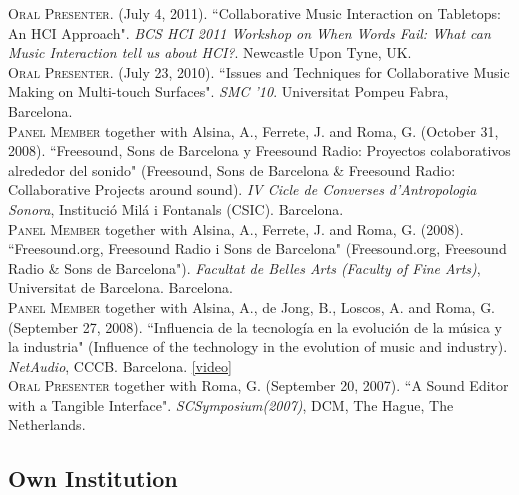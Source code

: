 \documentclass[10pt, a4paper]{article}
\newcommand{\years}[1]{\marginnote{\scriptsize #1}}
\begin{document}
{\years{2011a} \textsc{Oral Presenter}. (July 4, 2011). “Collaborative Music Interaction on Tabletops: An HCI Approach". \emph{BCS HCI 2011 Workshop on When Words Fail: What can Music Interaction tell us about HCI?}. Newcastle Upon Tyne, UK.\\
\years{2010} \textsc{Oral Presenter}. (July 23, 2010). “Issues and Techniques for Collaborative Music Making on Multi-touch Surfaces". \emph{SMC '10}. Universitat Pompeu Fabra, Barcelona.\\
\years{2008c} \textsc{Panel Member} together with Alsina, A., Ferrete, J. and Roma, G. (October 31, 2008). “Freesound, Sons de Barcelona y Freesound Radio: Proyectos colaborativos alrededor del sonido" (Freesound, Sons de Barcelona \& Freesound Radio: Collaborative Projects around sound). \emph{IV Cicle de Converses d'Antropologia Sonora}, Institució Milá i Fontanals (CSIC). Barcelona.\\
\years{2008b} \textsc{Panel Member} together with Alsina, A., Ferrete, J. and Roma, G. (2008). “Freesound.org, Freesound Radio i Sons de Barcelona" (Freesound.org, Freesound Radio \& Sons de Barcelona"). \emph{Facultat de Belles Arts (Faculty of Fine Arts)}, Universitat de Barcelona. Barcelona.\\
\years{2008a} \textsc{Panel Member} together with Alsina, A., de Jong, B., Loscos, A. and Roma, G. (September 27, 2008). “Influencia de la tecnología en la evolución de la música y la industria" (Influence of the technology in the evolution of music and industry). \emph{NetAudio}, CCCB. Barcelona. \href{https://www.youtube.com/watch?v=6JlCCvYXrHY}{[video]}\\
\years{2007}\textsc{Oral Presenter} together with Roma, G. (September 20, 2007). “A Sound Editor with a Tangible Interface". \emph{SCSymposium(2007)}, DCM, The Hague, The Netherlands.

\subsection*{Own Institution}
\noindent

}
\end{document}
